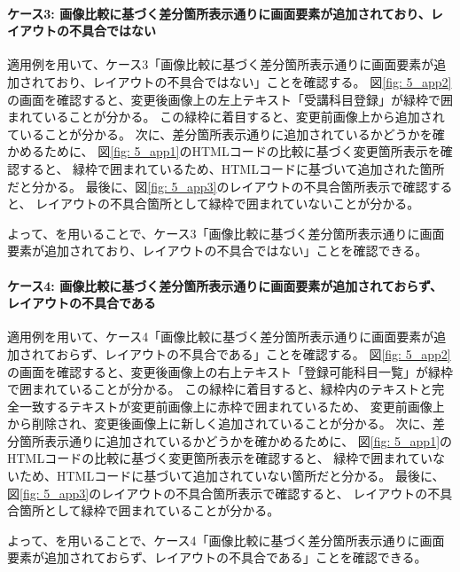 \paragraph{ケース3: 画像比較に基づく差分箇所表示通りに画面要素が追加されており、レイアウトの不具合ではない}\label{sec:result_area3}
適用例を用いて、ケース3「画像比較に基づく差分箇所表示通りに画面要素が追加されており、レイアウトの不具合ではない」ことを確認する。
図\ref{fig: 5_app2}の画面を確認すると、変更後画像上の左上テキスト「受講科目登録」が緑枠で囲まれていることが分かる。
この緑枠に着目すると、変更前画像上から追加されていることが分かる。
次に、差分箇所表示通りに追加されているかどうかを確かめるために、
図\ref{fig: 5_app1}のHTMLコードの比較に基づく変更箇所表示を確認すると、
緑枠で囲まれているため、HTMLコードに基づいて追加された箇所だと分かる。
最後に、図\ref{fig: 5_app3}のレイアウトの不具合箇所表示で確認すると、
レイアウトの不具合箇所として緑枠で囲まれていないことが分かる。
\par
よって、\toolName を用いることで、ケース3「画像比較に基づく差分箇所表示通りに画面要素が追加されており、レイアウトの不具合ではない」ことを確認できる。


\paragraph{ケース4: 画像比較に基づく差分箇所表示通りに画面要素が追加されておらず、レイアウトの不具合である}\label{sec:result_area4}
適用例を用いて、ケース4「画像比較に基づく差分箇所表示通りに画面要素が追加されておらず、レイアウトの不具合である」ことを確認する。
図\ref{fig: 5_app2}の画面を確認すると、変更後画像上の右上テキスト「登録可能科目一覧」が緑枠で囲まれていることが分かる。
この緑枠に着目すると、緑枠内のテキストと完全一致するテキストが変更前画像上に赤枠で囲まれているため、
変更前画像上から削除され、変更後画像上に新しく追加されていることが分かる。
次に、差分箇所表示通りに追加されているかどうかを確かめるために、
図\ref{fig: 5_app1}のHTMLコードの比較に基づく変更箇所表示を確認すると、
緑枠で囲まれていないため、HTMLコードに基づいて追加されていない箇所だと分かる。
最後に、図\ref{fig: 5_app3}のレイアウトの不具合箇所表示で確認すると、
レイアウトの不具合箇所として緑枠で囲まれていることが分かる。
\par
よって、\toolName を用いることで、ケース4「画像比較に基づく差分箇所表示通りに画面要素が追加されておらず、レイアウトの不具合である」ことを確認できる。

